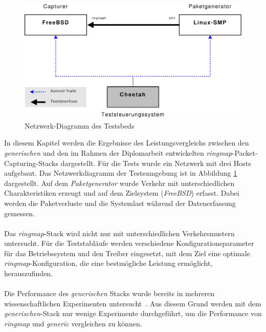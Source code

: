 \begin{figure} 
\centering \includegraphics[width=5.5in]{bilder/Messaufbau}
\caption{Netzwerk-Diagramm des Testsbeds}
\label{img:test_aufbau}
\end{figure}
In diesem Kapitel werden die Ergebnisse des Leistungsvergleichs zwischen den
\emph{generischen} und den im Rahmen der Diplomarbeit entwickelten
\emph{ringmap}-Packet-Capturing-Stacks dargestellt. Für die Tests wurde ein
Netzwerk mit drei Hosts aufgebaut. Das Netzwerkdiagramm der Testsumgebung ist
in Abbildung \ref{img:test_aufbau} dargestellt. Auf dem \emph{Paketgenerator}
wurde Verkehr mit unterschiedlichen Charakteristiken erzeugt und auf dem
Zielsystem (\emph{FreeBSD}) erfasst. Dabei werden die Paketverluste und die
Systemlast während der Datenerfassung gemessen. \\\\
%
Das \emph{ringmap}-Stack wird nicht nur mit unterschiedlichen Verkehrsmustern
untersucht. Für die Teststabläufe werden verschiedene Konfigurationsparameter
für das Betriebssystem und den Treiber eingesetzt, mit dem Ziel eine optimale
\emph{ringmap}-Konfiguration, die eine bestmögliche Leistung ermöglicht,
herauszufinden.\\\\
%
Die Performance des \emph{generischen} Stacks wurde bereits in mehreren
wissenschaftlichen Experimenten untersucht~\cite{fabian_da, pcin10gb_paper,
perfev_paper}. Aus diesem Grund werden mit dem \emph{generischen}-Stack nur
wenige Experimente durchgeführt, um die Performance von \emph{ringmap} und
\emph{generic} vergleichen zu können.


